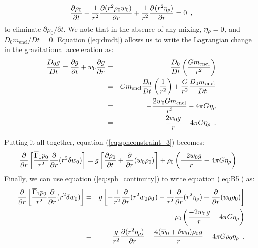 \begin{enumerate}
\begin{description}
\begin{equation}
\label{eq:sph_continuity}
\frac{\partial \rho_0}{\partial t} + \frac{1}{r^2} \frac{\partial (r^2 \rho_0 w_0)}{\partial r} 
+ \frac{1}{r^2} \frac{\partial (r^2 \eta_{\rho} )}{\partial r}  = 0 \enskip ,
\end{equation}
to eliminate $\partial \rho_0/\partial t$.  We note that in the
absence of any mixing, $\eta_{\rho}=0$, and  $D_0 m_\mathrm{encl}/Dt = 0.$
Equation (\ref{eq:dmdt})
allows us to write the Lagrangian change in the gravitational
acceleration as:
\begin{eqnarray}
\frac{D_0 g}{D t} = \frac{\partial g}{\partial t} + w_0 \frac{\partial g}{\partial r} &=& \frac{D_0}{Dt}\left(\frac{G m_\mathrm{encl}}{r^2}\right) \nonumber \\
&=& G m_\mathrm{encl}\frac{D_0}{D t}\left(\frac{1}{r^2}\right) + \frac{G}{r^2}\frac{D_0 m_\mathrm{encl}}{Dt} \nonumber \\
&=& -\frac{2 w_0 G m_\mathrm{encl}}{r^3} - 4 \pi G \eta_{\rho} \nonumber \\
&=& -\frac{2 w_0 g}{r} - 4 \pi G \eta_{\rho} \enskip .
\end{eqnarray}

Putting it all together, equation (\ref{eq:sphconstraint_3}) becomes:
\begin{equation}
 \frac{\partial}{\partial r} \left[ \frac{\overline{\Gamma}_1 p_0}{r^2} \frac{\partial}{\partial r} (r^2 \delta w_0) \right] 
= 
  g \left [ \frac{\partial \rho_0}{\partial t} + \frac{\partial}{\partial r} (w_0 \rho_0) \right ]
+ \rho_0 \left(\frac{-2 w_0 g}{r} - 4 \pi G \eta_{\rho} \right) \label{eq:B5} \enskip.
\end{equation}
Finally, we can use equation (\ref{eq:sph_continuity})
to write equation (\ref{eq:B5}) as:
\begin{eqnarray}
\frac{\partial}{\partial r} \left[ \frac{\overline{\Gamma}_1 p_0}{r^2} \frac{\partial}{\partial r} (r^2 \delta w_0) \right] &=&
 g \left [ -\frac{1}{r^2} \frac{\partial}{\partial r} (r^2 w_0 \rho_0)
           -\frac{1}{r^2} \frac{\partial}{\partial r} (r^2 \eta_{\rho})
           + \frac{\partial}{\partial r} (w_0 \rho_0) \right ] \nonumber \\
&& + \rho_0 \left(\frac{-2 w_0 g}{r} - 4 \pi G \eta_{\rho} \right) \nonumber \\
&=& - \frac{g}{r^2} \frac{\partial (r^2 \eta_{\rho})}{\partial r} 
- \frac{4 (\overline{w}_0 + \delta w_0) \rho_0 g}{r} - 4 \pi G \rho_0 \eta_{\rho} \label{eq:B7} \enskip .
\end{eqnarray}


\end{description}
\end{enumerate}
